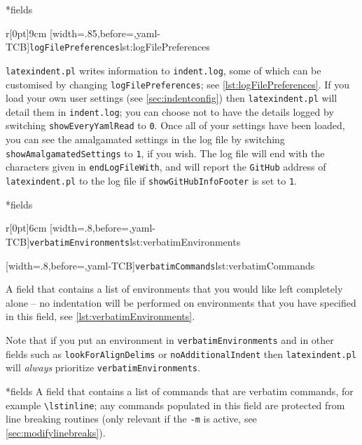 *{fields}
	\begin{wrapfigure}[10]{r}[0pt]{9cm}
		[width=.85\linewidth,before=\centering,yaml-TCB]{\texttt{logFilePreferences}}{lst:logFilePreferences}
	\end{wrapfigure}
	\texttt{latexindent.pl} writes information to \texttt{indent.log}, some
	of which can be customised by changing \texttt{logFilePreferences}; see \cref{lst:logFilePreferences}.
	If you load your own user settings (see \vref{sec:indentconfig}) then \texttt{latexindent.pl} will
	detail them in \texttt{indent.log}; you can choose not to have the details logged by switching
	\texttt{showEveryYamlRead} to \texttt{0}. Once all of your settings have
	been loaded, you can see the amalgamated settings in the log file by switching \texttt{showAmalgamatedSettings}
	to \texttt{1}, if you wish. The log file will end with the characters
	given in \texttt{endLogFileWith}, and will report the \texttt{GitHub} address
	of \texttt{latexindent.pl} to the log file if \texttt{showGitHubInfoFooter} is set to \texttt{1}.

*{fields}

	\begin{wrapfigure}[14]{r}[0pt]{6cm}
		[width=.8\linewidth,before=\centering,yaml-TCB]{\texttt{verbatimEnvironments}}{lst:verbatimEnvironments}

		\vspace{.2cm}
		[width=.8\linewidth,before=\centering,yaml-TCB]{\texttt{verbatimCommands}}{lst:verbatimCommands}
	\end{wrapfigure}
	A field that contains a list of environments
	that you would like left completely alone -- no indentation will be performed
	on environments that you have specified in this field, see \cref{lst:verbatimEnvironments}.

	Note that if  you put an environment in \texttt{verbatimEnvironments}
	and in other fields such as \texttt{lookForAlignDelims} or \texttt{noAdditionalIndent}
	then \texttt{latexindent.pl} will \emph{always} prioritize \texttt{verbatimEnvironments}.

*{fields}
	A field that contains a list of commands that are verbatim commands, for example
	\lstinline|\lstinline|; any commands populated in this field are protected from line breaking
	routines (only relevant if the \texttt{-m} is active, see \vref{sec:modifylinebreaks}).


